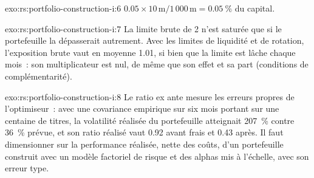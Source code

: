 \begin{solution}{exo:rs:portfolio-construction-i:6}
$0.05 \times 10\,\mathrm{m}/1\,000\,\mathrm{m} = 0.05~\%$ du capital.
\end{solution}

\begin{solution}{exo:rs:portfolio-construction-i:7}
La limite brute de 2 n'est saturée que si le portefeuille la dépasserait autrement. Avec les limites de liquidité et de rotation, l'exposition brute vaut en moyenne 1.01, si bien que la limite est lâche chaque
mois~: son multiplicateur est nul, de même que son effet et sa part (conditions de complémentarité).
\end{solution}

\begin{solution}{exo:rs:portfolio-construction-i:8}
Le ratio ex ante mesure les erreurs propres de l'optimiseur~: avec une covariance empirique sur six mois portant sur une centaine de titres, la volatilité réalisée du portefeuille atteignait 207~\% contre 36~\%
prévue, et son ratio réalisé vaut 0.92 avant frais et 0.43 après. Il faut dimensionner sur la performance réalisée, nette des coûts, d'un portefeuille construit avec un modèle factoriel de risque et des
alphas mis à l'échelle, avec son erreur type.
\end{solution}

